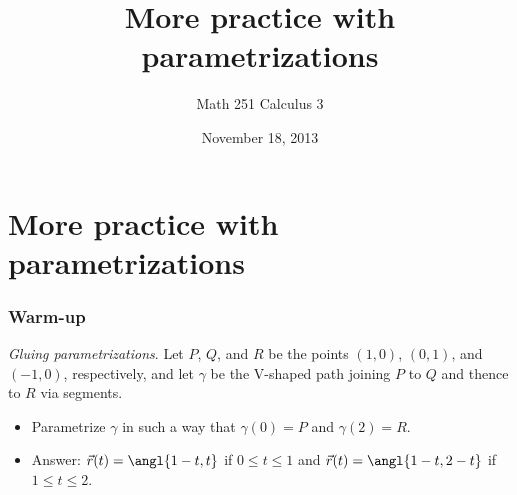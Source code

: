 \documentclass[11pt,ignorenonframetext,aspectratio=169,xcolor={svgnames}]{beamer}
\title{More practice with parametrizations}
\author{Math 251 Calculus 3}
\date{November 18, 2013}
\begin{document}
\frame{\titlepage}

\section{More practice with parametrizations}



\begin{frame}\frametitle{Warm-up}

\emph{Gluing parametrizations}. Let $P$, $Q$, and $R$ be the points
$(1,0)$, $(0,1)$, and $(-1,0)$, respectively, and let $\gamma$ be the
V-shaped path joining $P$ to $Q$ and thence to $R$ via segments.

\begin{itemize}[<+->]
\itemsep1pt\parskip0pt
\item
  Parametrize $\gamma$ in such a way that $\gamma(0) = P$ and
  $\gamma(2) = R$.
\item
  Answer: $\vec{r}(t) = \angl{1-t, t}$ if $0 \leq t \leq 1$ and
  $\vec{r}(t) = \angl{1-t, 2-t}$ if $1 \leq t \leq 2$.
\end{itemize}

\end{frame}
\end{document}
